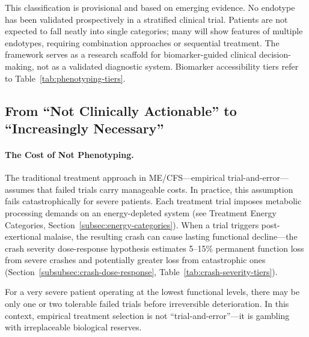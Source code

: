 \begin{limitation}
This classification is provisional and based on emerging evidence. No endotype has been validated prospectively in a stratified clinical trial. Patients are not expected to fall neatly into single categories; many will show features of multiple endotypes, requiring combination approaches or sequential treatment. The framework serves as a research scaffold for biomarker-guided clinical decision-making, not as a validated diagnostic system. Biomarker accessibility tiers refer to Table~\ref{tab:phenotyping-tiers}.
\end{limitation}

\subsection{From ``Not Clinically Actionable'' to ``Increasingly Necessary''}
\label{sec:phenotyping-imperative}

\paragraph{The Cost of Not Phenotyping.}
The traditional treatment approach in ME/CFS---empirical trial-and-error---assumes that failed trials carry manageable costs. In practice, this assumption fails catastrophically for severe patients. Each treatment trial imposes metabolic processing demands on an energy-depleted system (see Treatment Energy Categories, Section~\ref{subsec:energy-categories}). When a trial triggers post-exertional malaise, the resulting crash can cause lasting functional decline---the crash severity dose-response hypothesis estimates 5--15\% permanent function loss from severe crashes and potentially greater loss from catastrophic ones (Section~\ref{subsubsec:crash-dose-response}, Table~\ref{tab:crash-severity-tiers}).

For a very severe patient operating at the lowest functional levels, there may be only one or two tolerable failed trials before irreversible deterioration. In this context, empirical treatment selection is not ``trial-and-error''---it is gambling with irreplaceable biological reserves.

